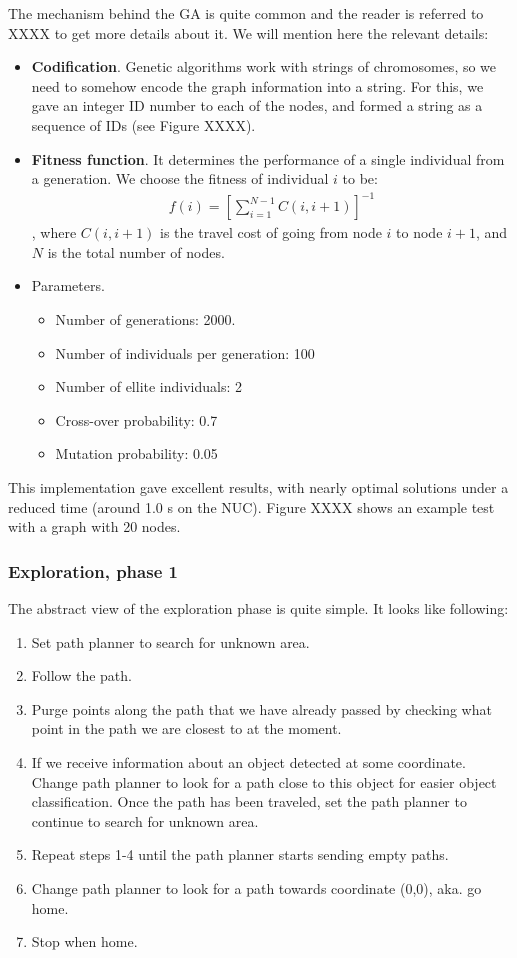 The mechanism behind the GA is quite common and the reader is referred to XXXX to get more details about it. We will mention here the relevant details:
\begin{itemize}
\item \textbf{Codification}. Genetic algorithms work with strings of chromosomes, so we need to somehow encode the graph information into a string. For this, we gave an integer ID number to each of the nodes, and formed a string as a sequence of IDs (see Figure XXXX).
\item \textbf{Fitness function}. It determines the performance of a single individual from a generation. We choose the fitness of individual $i$ to be:
\begin{align}
f(i) = \left[\sum_{i = 1}^{N-1} C(i,i+1)\right]^{-1}
\end{align}
, where $C(i, i+1)$ is the travel cost of going from node $i$ to node $i+1$, and $N$ is the total number of nodes.
\item Parameters. 
\begin{itemize}
\item Number of generations: 2000.
\item Number of individuals per generation: 100
\item Number of ellite individuals: 2
\item Cross-over probability: 0.7
\item Mutation probability: 0.05
\end{itemize}
\end{itemize}

This implementation gave excellent results, with nearly optimal solutions under a reduced time (around 1.0 s on the NUC). Figure XXXX shows an example test with a graph with 20 nodes. 

\subsubsection{Exploration, phase 1}

The abstract view of the exploration phase is quite simple. It looks like following:

\begin{enumerate}
\item Set path planner to search for unknown area.
\item Follow the path.
\item Purge points along the path that we have already passed by checking what point in the path we are closest to at the moment.
\item If we receive information about an object detected at some coordinate. Change path planner to look for a path close to this object for easier object classification. Once the path has been traveled, set the path planner to continue to search for unknown area.
\item Repeat steps 1-4 until the path planner starts sending empty paths. 
\item Change path planner to look for a path towards coordinate (0,0), aka. go home.
\item Stop when home.
\end{enumerate}

